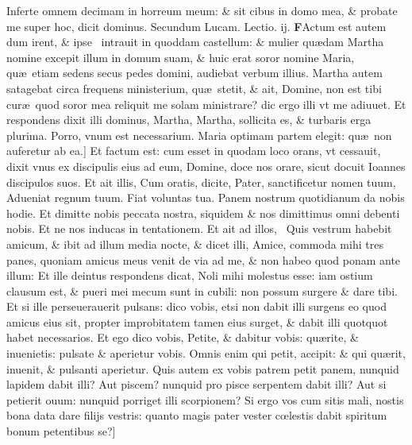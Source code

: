 \documentclass[a5paper,10pt]{book}
\def\rightmarginnote{%
	\lrmarginnote{\hskip\columnwidth \hskip -1em}}
\def\ae{æ}
\def\oe{œ}
\begin{document}
\begin{multicols*}{2}
Inferte omnem decimam in horreum meum: \& sit cibus in domo mea, \& probate me super hoc, dicit dominus.
\fancyhead[C]{\color{red} Feria. vj. Dominic\ae . iiij. aduentus}
\newline \color{red} Secundum Lucam. \hfill Lectio. ij. \color{black}
\vspace{-.25em}
\lettrine[lines=2]{\bfseries \color{red} F}{}Actum\rightmarginnote{c. 10.\\e} est autem dum irent, \& ipse \textdagger \ intrauit in quoddam
castellum: \& mulier qu\ae dam Martha nomine excepit illum in domum suam, \& huic erat soror nomine Maria, qu\ae \ etiam sedens secus pedes domini, audiebat verbum illius.
Martha autem satagebat circa frequens ministerium, qu\ae \ stetit, \& ait, Domine, non est tibi cur\ae \ quod soror mea reliquit me solam ministrare? dic ergo illi vt me adiuuet.
Et respondens dixit illi dominus, Martha, Martha, sollicita es, \& turbaris erga plurima.
Porro, vnum est necessarium. Maria optimam partem elegit: qu\ae \ non auferetur ab ea.]
\newline \indent Et\rightmarginnote{c. 11.\\a} factum est: cum esset in quodam loco orans, vt cessauit, dixit vnus ex discipulis eius ad eum, Domine, doce nos orare, sicut docuit Ioannes discipulos suos.
Et ait illis, Cum oratis, dicite, Pater, sanctificetur nomen tuum, Adueniat regnum tuum. Fiat voluntas tua.
Panem nostrum quotidianum da nobis hodie. Et dimitte nobis peccata nostra, siquidem \& nos dimittimus omni debenti nobis.
Et ne nos inducas in tentationem.
Et ait ad illos, \textdagger \ Quis\rightmarginnote{B} vestrum habebit amicum, \& ibit ad illum media nocte, \& dicet illi, Amice, commoda mihi tres panes, quoniam amicus meus venit de via ad me, \& non habeo quod ponam ante illum: Et ille deintus respondens dicat, Noli mihi molestus esse: iam ostium clausum est, \& pueri mei mecum sunt in cubili: non possum surgere \& dare tibi.
Et si ille perseuerauerit pulsans: dico vobis, etsi non dabit illi surgens eo quod amicus eius sit, propter improbitatem tamen eius surget, \& dabit illi quotquot habet necessarios.
Et ego dico vobis, Petite, \& dabitur vobis: qu\ae rite, \& inuenietis: pulsate \& aperietur vobis. Omnis enim qui petit, accipit: \& qui qu\ae rit, inuenit, \& pulsanti aperietur.
Quis autem ex vobis patrem petit panem, nunquid lapidem dabit illi?
Aut piscem? nunquid pro pisce serpentem dabit illi? Aut si petierit ouum: nunquid porriget illi scorpionem?
Si ergo vos cum sitis mali, nostis bona data dare filijs vestris: quanto magis pater vester c\oe lestis dabit spiritum bonum petentibus se?]

\end{multicols*}
\end{document}
